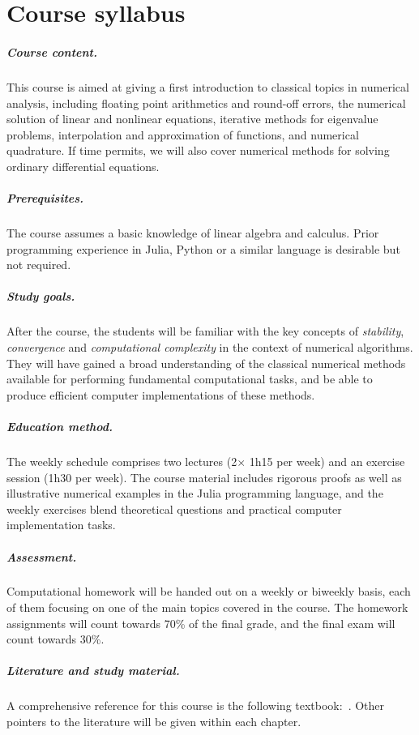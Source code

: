 \chapter*{Course syllabus}%

\paragraph{Course content.}%
This course is aimed at giving a first introduction to classical topics in numerical analysis,
including floating point arithmetics and round-off errors,
the numerical solution of linear and nonlinear equations,
iterative methods for eigenvalue problems,
interpolation and approximation of functions,
and numerical quadrature.
If time permits, we will also cover numerical methods for solving ordinary differential equations.

\paragraph{Prerequisites.}%
The course assumes a basic knowledge of linear algebra and calculus.
Prior programming experience in Julia, Python or a similar language is desirable but not required.

\paragraph{Study goals.}%
After the course,
the students will be familiar with the key concepts of \emph{stability}, \emph{convergence} and \emph{computational complexity} in the context of numerical algorithms.
They will have gained a broad understanding of the classical numerical methods available for performing fundamental computational tasks,
and be able to produce efficient computer implementations of these methods.

\paragraph{Education method.}%
The weekly schedule comprises two lectures (2$\times$ 1h15 per week) and an exercise session (1h30 per week).
The course material includes rigorous proofs as well as illustrative numerical examples in the Julia programming language,
and the weekly exercises blend theoretical questions and practical computer implementation tasks.

\paragraph{Assessment.}%
\label{par:assessment}
Computational homework will be handed out on a weekly or biweekly basis,
each of them focusing on one of the main topics covered in the course.
The homework assignments will count towards 70\% of the final grade,
and the final exam will count towards 30\%.

\paragraph{Literature and study material.}%
A comprehensive reference for this course is the following textbook:~.
Other pointers to the literature will be given within each chapter.
